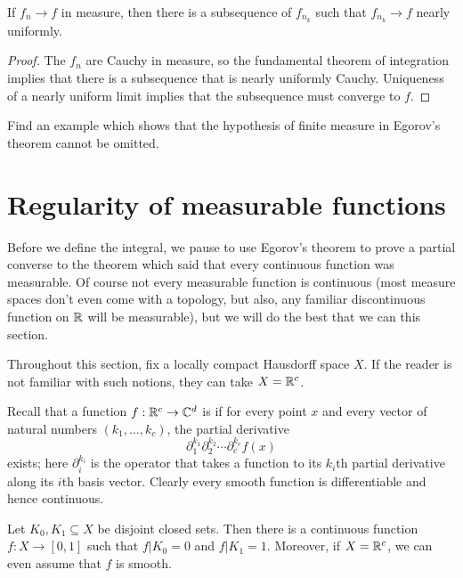 \begin{corollary}
If $f_n \to f$ in measure, then there is a subsequence of $f_{n_k}$ such that $f_{n_k} \to f$ nearly uniformly.
\end{corollary}
\begin{proof}
The $f_n$ are Cauchy in measure, so the fundamental theorem of integration implies that there is a subsequence that is nearly uniformly Cauchy.
Uniqueness of a nearly uniform limit implies that the subsequence must converge to $f$.
\end{proof}

\begin{exercise}
Find an example which shows that the hypothesis of finite measure in Egorov's theorem cannot be omitted.
\end{exercise}

\section{Regularity of measurable functions}
Before we define the integral, we pause to use Egorov's theorem to prove a partial converse to the theorem which said that every continuous function was measurable.
Of course not every measurable function is continuous (most measure spaces don't even come with a topology, but also, any familiar discontinuous function on $\mathbb{R}$ will be measurable), but we will do the best that we can this section.

\begin{subsec}
Throughout this section, fix a locally compact Hausdorff space $X$. If the reader is not familiar with such notions, they can take $X = \mathbb{R}^c$.
\end{subsec}

\begin{subsec}
Recall that a function $f: \mathbb{R}^c \to \mathbb{C}^d$ is  if for every point $x$ and every vector of natural numbers $(k_1, \dots, k_c)$, the partial derivative
$$\partial_1^{k_1} \partial_2^{k_2} \cdots \partial_c^{k_c} f(x)$$
exists; here $\partial_i^{k_i}$ is the operator that takes a function to its $k_i$th partial derivative along its $i$th basis vector.
Clearly every smooth function is differentiable and hence continuous.
\end{subsec}

\begin{lemma}[Urysohn]
Let $K_0,K_1 \subseteq X$ be disjoint closed sets. Then there is a continuous function $f: X \to [0, 1]$ such that $f|K_0 = 0$ and $f|K_1 = 1$.
Moreover, if $X = \mathbb{R}^c$, we can even assume that $f$ is smooth.
\end{lemma}

